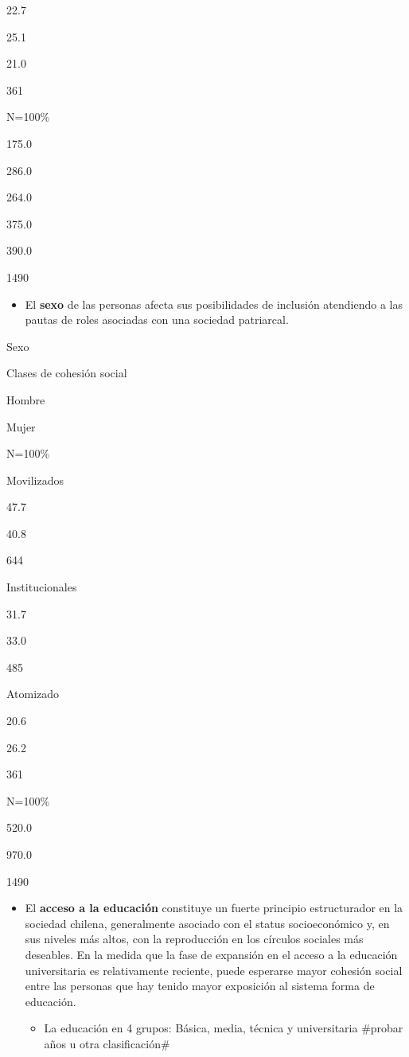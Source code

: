 \documentclass[
  12pt,
]{book}
\providecommand{\tightlist}{%
  \setlength{\itemsep}{0pt}\setlength{\parskip}{0pt}}
\begin{document}
22.7

25.1

21.0

361

N=100\%

175.0

286.0

264.0

375.0

390.0

1490

\begin{itemize}
\tightlist
\item
  El \textbf{sexo} de las personas afecta sus posibilidades de inclusión atendiendo a las pautas de roles asociadas con una sociedad patriarcal.
\end{itemize}

Sexo

Clases de cohesión social

Hombre

Mujer

N=100\%

Movilizados

47.7

40.8

644

Institucionales

31.7

33.0

485

Atomizado

20.6

26.2

361

N=100\%

520.0

970.0

1490

\begin{itemize}
\tightlist
\item
  El \textbf{acceso a la educación} constituye un fuerte principio estructurador en la sociedad chilena, generalmente asociado con el status socioeconómico y, en sus niveles más altos, con la reproducción en los círculos sociales más deseables. En la medida que la fase de expansión en el acceso a la educación universitaria es relativamente reciente, puede esperarse mayor cohesión social entre las personas que hay tenido mayor exposición al sistema forma de educación.

  \begin{itemize}
  \tightlist
  \item
    La educación en 4 grupos: Básica, media, técnica y universitaria \#probar años u otra clasificación\#
  \end{itemize}
\end{itemize}
\end{document}
